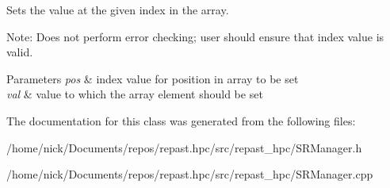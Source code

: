 Sets the value at the given index in the array. 

Note\-: Does not perform error checking; user should ensure that index value is valid.


\begin{DoxyParams}{Parameters}
{\em pos} & index value for position in array to be set \\
\hline
{\em val} & value to which the array element should be set \\
\hline
\end{DoxyParams}


The documentation for this class was generated from the following files\-:\begin{DoxyCompactItemize}
\item 
/home/nick/\-Documents/repos/repast.\-hpc/src/repast\-\_\-hpc/S\-R\-Manager.\-h\item 
/home/nick/\-Documents/repos/repast.\-hpc/src/repast\-\_\-hpc/S\-R\-Manager.\-cpp\end{DoxyCompactItemize}
